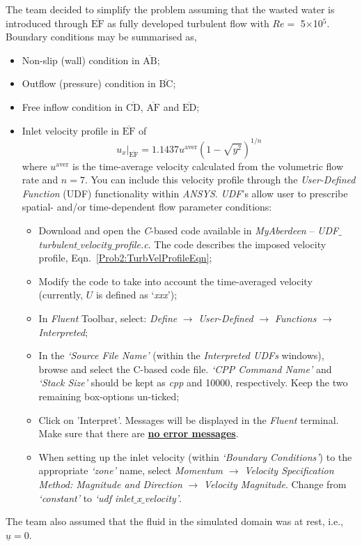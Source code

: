 \documentclass[12pts,a4paper,amsmath,amssymb,floatfix]{article}%
\begin{document}
\begin{enumerate}[label=\bfseries Problem \arabic*:]
The team decided to simplify the problem assuming that the wasted water is introduced through $\overline{\text{EF}}$ as fully developed turbulent flow with $Re=$ 5$\times$10$^{5}$. Boundary conditions may be summarised as, 
\begin{itemize}
  \item Non-slip (wall) condition in $\overline{\text{AB}}$;
  \item Outflow (pressure) condition in  $\overline{\text{BC}}$;
  \item Free inflow condition in  $\overline{\text{CD}}$, $\overline{\text{AF}}$ and $\overline{\text{ED}}$;
  \item Inlet velocity profile in $\overline{\text{EF}}$ of
    \begin{equation}
        \left.u_{x}\right|_{\overline{\text{EF}}} = 1.1437 u^{\text{aver}} \left(1 - \sqrt{y^{2}}\right)^{1/n} \label{Prob2:TurbVelProfileEqn}
    \end{equation}
    where $u^{\text{aver}}$ is the time-average velocity calculated from the volumetric flow rate and $n=7$. You can include this velocity profile through the {\it User-Defined Function} (UDF) functionality within {\it ANSYS}. {\it UDF}'s allow user to prescribe spatial- and/or time-dependent flow parameter conditions:
    \begin{itemize}
        \item Download and open the {\it C}-based code available in {\it MyAberdeen} -- {\it UDF$\_$turbulent$\_$velocity$\_$profile.c}. The code describes the imposed velocity profile, Eqn.~\ref{Prob2:TurbVelProfileEqn};
        \item Modify the code to take into account the time-averaged velocity (currently, $U$ is defined as `{\it xxx}');
        \item In {\it Fluent} Toolbar, select: {\it Define} $\rightarrow$ {\it User-Defined} $\rightarrow$ {\it Functions} $\rightarrow$ {\it Interpreted};
        \item In the {\it `Source File Name'} (within the {\it Interpreted UDFs} windows), browse and select the C-based code file. {\it `CPP Command Name'} and {\it `Stack Size'}  should be kept as {\it cpp} and 10000, respectively. Keep the two remaining box-options un-ticked;
        \item Click on 'Interpret'. Messages will be displayed in the {\it Fluent} terminal. Make sure that there are {\bf \underline{no error messages}}.
        \item When setting up the inlet velocity (within {\it `Boundary Conditions'}) to the appropriate {\it `zone'} name, select {\it Momentum} $\rightarrow$ {\it Velocity Specification Method: Magnitude and Direction} $\rightarrow$ {\it Velocity Magnitude}. Change from {\it `constant'} to {\it `udf inlet$\_$x$\_$velocity'}.
    \end{itemize}
\end{itemize} 
The team also assumed that the fluid in the simulated domain was at rest, i.e., $\underline{u}=0$.
  



\end{enumerate}
\end{document}
